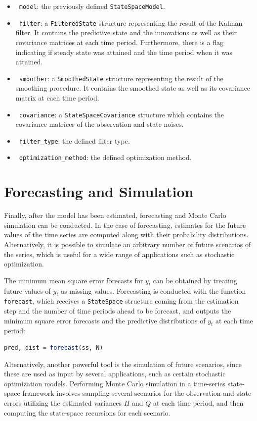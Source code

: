 \documentclass{juliacon}
\begin{document}
\begin{itemize}
    \item ~\texttt{model}: the previously defined \texttt{StateSpaceModel}.
    \item ~\texttt{filter}: a \texttt{FilteredState} structure representing the result of the Kalman filter. It contains the predictive state and the innovations as well as their covariance matrices at each time period. Furthermore, there is a flag indicating if steady state was attained and the time period when it was attained.
    \item ~\texttt{smoother}: a \texttt{SmoothedState} structure representing the result of the smoothing procedure. It contains the smoothed state as well as its covariance matrix at each time period.
    \item ~\texttt{covariance}: a \texttt{StateSpaceCovariance} structure which contains the covariance matrices of the observation and state noises.
    \item ~\texttt{filter\_type}: the defined filter type.
    \item ~\texttt{optimization\_method}: the defined optimization method.
\end{itemize}

\section{Forecasting and Simulation} \label{sec:forecasting}

Finally, after the model has been estimated, forecasting and Monte Carlo simulation can be conducted. In the case of forecasting, estimates for the future values of the time series are computed along with their probability distributions. Alternatively, it is possible to simulate an arbitrary number of future scenarios of the series, which is useful for a wide range of applications such as stochastic optimization.

The minimum mean square error forecasts for $y_{t}$ can be obtained by treating future values of $y_{t}$ as missing values. Forecasting is conducted with the function \texttt{forecast}, which receives a \texttt{StateSpace} structure coming from the estimation step and the number of time periods ahead to be forecast, and outputs the minimum square error forecasts and the predictive distributions of $y_{t}$ at each time period:
%
\begin{lstlisting}[language = Julia]
pred, dist = forecast(ss, N)
\end{lstlisting}
%
Alternatively, another powerful tool is the simulation of future scenarios, since these are used as input by several applications, such as certain stochastic optimization models. Performing Monte Carlo simulation in a time-series state-space framework involves sampling several scenarios for the observation and state errors utilizing the estimated variances $H$ and $Q$ at each time period, and then computing the state-space recursions for each scenario.
\end{document}
